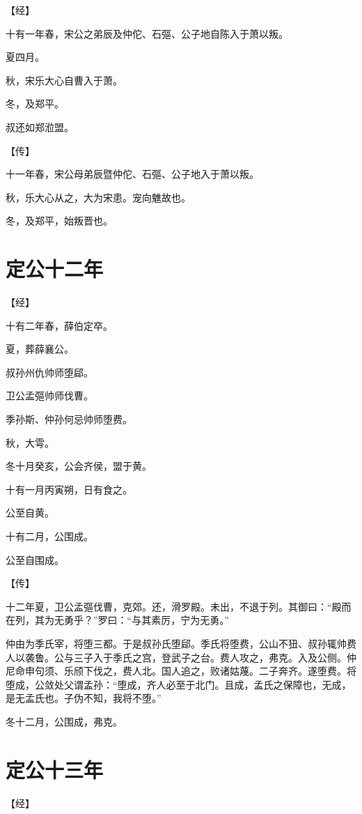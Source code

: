 \documentclass[a4paper,12pt,UTF8,twoside]{ctexbook}
\begin{document}
【经】

十有一年春，宋公之弟辰及仲佗、石彄、公子地自陈入于萧以叛。

夏四月。

秋，宋乐大心自曹入于萧。

冬，及郑平。

叔还如郑涖盟。

【传】

十一年春，宋公母弟辰暨仲佗、石彄、公子地入于萧以叛。

秋，乐大心从之，大为宋患。宠向魋故也。

冬，及郑平，始叛晋也。



\section{定公十二年}


【经】

十有二年春，薛伯定卒。

夏，葬薛襄公。

叔孙州仇帅师堕郈。

卫公孟彄帅师伐曹。

季孙斯、仲孙何忌帅师堕费。

秋，大雩。

冬十月癸亥，公会齐侯，盟于黄。

十有一月丙寅朔，日有食之。

公至自黄。

十有二月，公围成。

公至自围成。

【传】

十二年夏，卫公孟彄伐曹，克郊。还，滑罗殿。未出，不退于列。其御曰：“殿而在列，其为无勇乎？”罗曰：“与其素厉，宁为无勇。”

仲由为季氏宰，将堕三都。于是叔孙氏堕郈。季氏将堕费，公山不狃、叔孙辄帅费人以袭鲁。公与三子入于季氏之宫，登武子之台。费人攻之，弗克。入及公侧。仲尼命申句须、乐颀下伐之，费人北。国人追之，败诸姑蔑。二子奔齐。遂堕费。将堕成，公敛处父谓孟孙：“堕成，齐人必至于北门。且成，孟氏之保障也，无成，是无孟氏也。子伪不知，我将不堕。”

冬十二月，公围成，弗克。



\section{定公十三年}




【经】
\end{document}
